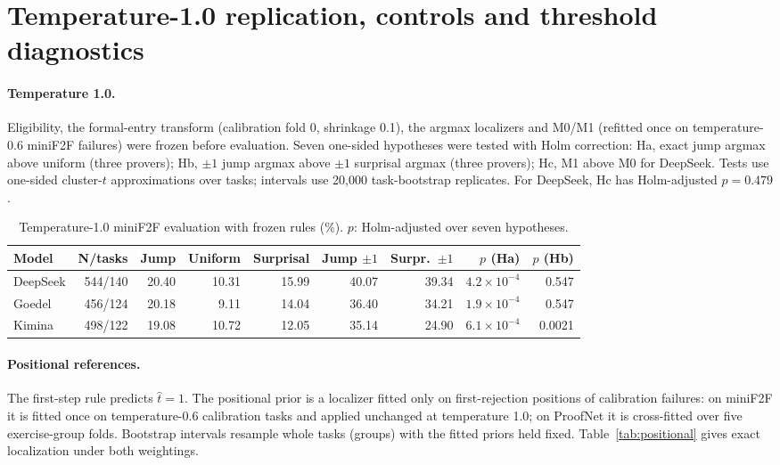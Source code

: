 \section{Temperature-1.0 replication, controls and threshold diagnostics}\label{app:temp}

\paragraph{Temperature 1.0.} Eligibility, the formal-entry transform (calibration fold 0, shrinkage 0.1), the argmax localizers and M0/M1 (refitted once on temperature-0.6 miniF2F failures) were frozen before evaluation. Seven one-sided hypotheses were tested with Holm correction: Ha, exact jump argmax above uniform (three provers); Hb, $\pm1$ jump argmax above $\pm1$ surprisal argmax (three provers); Hc, M1 above M0 for DeepSeek. Tests use one-sided cluster-$t$ approximations over tasks; intervals use 20,000 task-bootstrap replicates. For DeepSeek, Hc has Holm-adjusted $p=0.479$.

\begin{table}[h]
\caption{Temperature-1.0 miniF2F evaluation with frozen rules (\%). $p$: Holm-adjusted over seven hypotheses.}
\label{tab:temp}
\begin{center}
\small
\begin{tabular}{lrrrrrrrr}
\toprule
Model & N/tasks & Jump & Uniform & Surprisal & Jump $\pm1$ & Surpr.\ $\pm1$ & $p$ (Ha) & $p$ (Hb)\\
\midrule
DeepSeek & 544/140 & 20.40 & 10.31 & 15.99 & 40.07 & 39.34 & $4.2\times10^{-4}$ & 0.547\\
Goedel & 456/124 & 20.18 & 9.11 & 14.04 & 36.40 & 34.21 & $1.9\times10^{-4}$ & 0.547\\
Kimina & 498/122 & 19.08 & 10.72 & 12.05 & 35.14 & 24.90 & $6.1\times10^{-4}$ & 0.0021\\
\bottomrule
\end{tabular}
\end{center}
\end{table}

\paragraph{Positional references.} The first-step rule predicts $\hat t=1$. The positional prior is a localizer fitted only on first-rejection positions of calibration failures: on miniF2F it is fitted once on temperature-0.6 calibration tasks and applied unchanged at temperature 1.0; on ProofNet it is cross-fitted over five exercise-group folds. Bootstrap intervals resample whole tasks (groups) with the fitted priors held fixed. Table~\ref{tab:positional} gives exact localization under both weightings.


